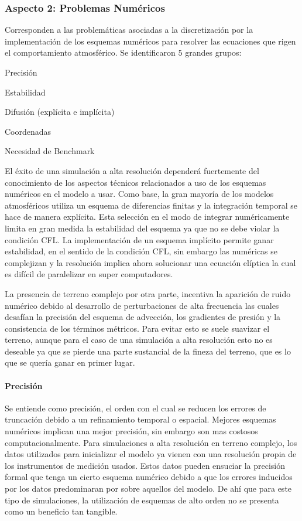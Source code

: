 \subsubsection{Aspecto 2: Problemas Numéricos}
Corresponden a las problemáticas asociadas a la discretización por la implementación de los esquemas numéricos para resolver las ecuaciones que rigen el comportamiento atmosférico. Se identificaron 5 grandes grupos:
\begin{itemize*}
	\item Precisión
	\item Estabilidad
	\item Difusión (explícita e implícita)
	\item Coordenadas
	\item Necesidad de Benchmark
\end{itemize*}

El éxito de una simulación a alta resolución dependerá fuertemente del conocimiento de los aspectos técnicos relacionados a uso de los esquemas numéricos en el modelo a usar. Como base, la gran mayoría de los modelos atmosféricos utiliza un esquema de diferencias finitas y la integración temporal se hace de manera explícita. Esta selección en el modo de integrar numéricamente limita en gran medida la estabilidad del esquema ya que no se debe violar la condición CFL. La implementación de un esquema implícito permite ganar estabilidad, en el sentido de la condición CFL, sin embargo las numéricas se complejizan y la resolución implica ahora solucionar una ecuación elíptica la cual es difícil de paralelizar en super computadores.

La presencia de terreno complejo por otra parte, incentiva la aparición de ruido numérico debido al desarrollo de perturbaciones de alta frecuencia las cuales desafían la precisión del esquema de advección, los gradientes de presión y la consistencia de los términos métricos. Para evitar esto se suele suavizar el terreno, aunque para el caso de una simulación a alta resolución esto no es deseable ya que se pierde una parte sustancial de la fineza del terreno, que es lo que se quería ganar en primer lugar. 

\paragraph{Precisión} Se entiende como precisión, el orden con el cual se reducen los errores de truncación debido a un refinamiento temporal o espacial. Mejores esquemas numéricos implican una mejor precisión, sin embargo son mas costosos computacionalmente. Para simulaciones a alta resolución en terreno complejo, los datos utilizados para inicializar el modelo ya vienen con una resolución propia de los instrumentos de medición usados. Estos datos pueden ensuciar la precisión formal que tenga un cierto esquema numérico debido a que los errores inducidos por los datos predominaran por sobre aquellos del modelo. De ahí que para este tipo de simulaciones, la utilización de esquemas de alto orden no se presenta como un beneficio tan tangible.


